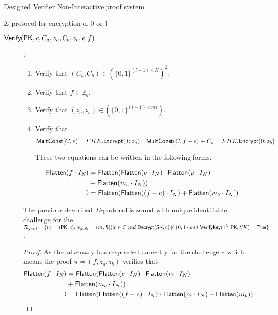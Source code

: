 \begin{section}{Designed Verifier Non-Interactive proof system}
\begin{subsection}{$\Sigma$-protocol for encryption of $0$ or $1$}
\begin{description}
      \item[${\mathsf{Verify}}(\mathsf{PK}, c, C_a, z_a, C_b, z_b, e, f)$]:
        \begin{enumerate}
        \item Verify that $(C_a, C_b) \in (\{0,1\}^{(l-1) \times N})^2$.
        \item Verify that $f \in \mathbb{Z}_q$.
        \item Verify that $(z_a, z_b) \in  (\{0,1\}^{(l-1) \times m)})$.
        \item Verify that
          \begin{align*}
            {\mathsf{MultConst}}(C, e) &= FHE.{\mathsf{Encrypt}}(f; z_a) & {\mathsf{MultConst}}(C, f-e) + C_b &= FHE.{\mathsf{Encrypt}}(0; z_b)
          \end{align*}

          These two equations can be written in the following forms.

          \begin{align*}
            {\mathsf{Flatten}}(f \cdot I_N) &= {\mathsf{Flatten}}({\mathsf{Flatten}}(e \cdot I_N) \cdot {\mathsf{Flatten}}(\mu \cdot I_N) \\
                                  &+ {\mathsf{Flatten}}(m_a \cdot I_N))\\
            0 &= {\mathsf{Flatten}}({\mathsf{Flatten}}((f-e) \cdot I_N) + {\mathsf{Flatten}}(m_b \cdot I_N))
          \end{align*}
        \end{enumerate}




        \begin{lemma}
          The previous described $\Sigma$-protocol is sound with unique identifiable challenge for the $\mathcal{R}_{guilt} = \{(x = (\mathsf{PK}, c),w_{guilt} = (m, R)) | c \in \mathcal{C}~and~{\mathsf{Decrypt}}(\mathsf{SK}, c) \not \in \{ 0, 1 \}~and~{\mathsf{VerifyKey}(1^{\lambda}, \mathsf{PK}, SK)} = \mathsf{True}\}$. 
        \end{lemma}

        \begin{proof}
          As the adversary has responded correctly for the challenge $e$ which means the proof $\pi = (f, z_a, z_b)$ verifies that
          \begin{align*}
            {\mathsf{Flatten}}(f \cdot I_N) &= {\mathsf{Flatten}}({\mathsf{Flatten}}(e \cdot I_N) \cdot {\mathsf{Flatten}}(m \cdot I_N) \\
                                  &+ {\mathsf{Flatten}}(m_a \cdot I_N))\\
            0 &= {\mathsf{Flatten}}({\mathsf{Flatten}}((f-e) \cdot I_N)\cdot {\mathsf{Flatten}}(m \cdot I_N) + {\mathsf{Flatten}}(m_b))
          \end{align*}
          

\end{proof}
\end{description}
\end{subsection}
\end{section}
